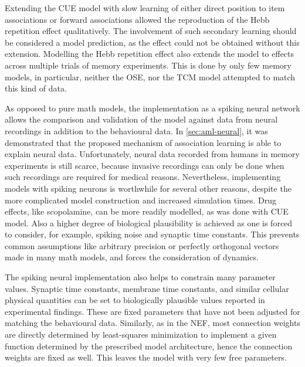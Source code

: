Extending the CUE model with slow learning of either direct position to item associations or forward associations allowed the reproduction of the Hebb repetition effect qualitatively.
The involvement of such secondary learning should be considered a model prediction, as the effect could not be obtained without this extension.
Modelling the Hebb repetition effect also extends the model to effects across multiple trials of memory experiments.
This is done by only few memory models, in particular, neither the OSE, nor the TCM model attempted to match this kind of data.

As opposed to pure math models, the implementation as a spiking neural network allows the comparison and validation of the model against data from neural recordings in addition to the behavioural data.
In \cref{sec:aml-neural}, it was demonstrated that the proposed mechanism of association learning is able to explain neural data.
Unfortunately, neural data recorded from humans in memory experiments is still scarce, because invasive recordings can only be done when such recordings are required for medical reasons.
Nevertheless, implementing models with spiking neurons is worthwhile for several other reasons, despite the more complicated model construction and increased simulation times.
Drug effects, like scopolamine, can be more readily modelled, as was done with CUE model.
Also a higher degree of biological plausibility is achieved as one is forced to consider, for example, spiking noise and synaptic time constants.
This prevents common assumptions like arbitrary precision or perfectly orthogonal vectors made in many math models, and forces the consideration of dynamics.

The spiking neural implementation also helps to constrain many parameter values.
Synaptic time constants, membrane time constants, and similar cellular physical quantities can be set to biologically plausible values reported in experimental findings.
These are fixed parameters that have not been adjusted for matching the behavioural data.
Similarly, as in the NEF, most connection weights are directly determined by least-squares minimization to implement a given function determined by the prescribed model architecture, hence the connection weights are fixed as well.
This leaves the model with very few free parameters.

